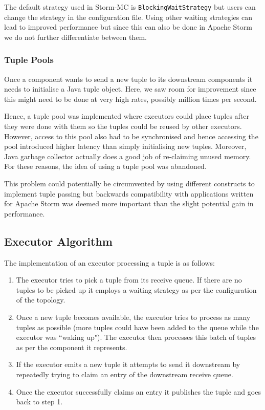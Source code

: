 The default strategy used in Storm-MC is \texttt{BlockingWaitStrategy} but users can change the strategy in the configuration file. Using other waiting strategies can lead to improved performance but since this can also be done in Apache Storm we do not further differentiate between them.

\subsubsection{Tuple Pools}

Once a component wants to send a new tuple to its downstream components it needs to initialise a Java tuple object. Here, we saw room for improvement since this might need to be done at very high rates, possibly million times per second.

Hence, a tuple pool was implemented where executors could place tuples after they were done with them so the tuples could be reused by other executors. However, access to this pool also had to be synchronised and hence accessing the pool introduced higher latency than simply initialising new tuples. Moreover, Java garbage collector actually does a good job of re-claiming unused memory. For these reasons, the idea of using a tuple pool was abandoned.

This problem could potentially be circumvented by using different constructs to implement tuple passing but backwards compatibility with applications written for Apache Storm was deemed more important than the slight potential gain in performance.

\subsection{Executor Algorithm}

The implementation of an executor processing a tuple is as follows:

\begin{enumerate}
	\item The executor tries to pick a tuple from its receive queue. If there are no tuples to be picked up it employs a waiting strategy as per the configuration of the topology.
	\item Once a new tuple becomes available, the executor tries to process as many tuples as possible (more tuples could have been added to the queue while the executor was ``waking up"). The executor then processes this batch of tuples as per the component it represents.
	\item If the executor emits a new tuple it attempts to send it downstream by repeatedly trying to claim an entry of the downstream receive queue.
	\item Once the executor successfully claims an entry it publishes the tuple and goes back to step 1.
\end{enumerate}

